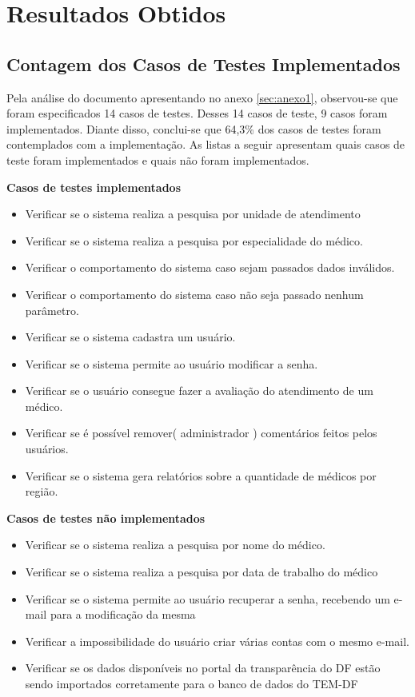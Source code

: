 \chapter[Resultados Obtidos]{Resultados Obtidos}

\section{Contagem dos Casos de Testes Implementados}
\label{sec:contagem-casos}
Pela análise do documento apresentando no anexo \ref{sec:anexo1}, observou-se que  foram especificados 14 casos de testes. Desses 14 casos de teste, 9 casos foram implementados. Diante disso, conclui-se que 64,3\% dos casos de testes foram contemplados com a implementação. As listas a seguir apresentam quais casos de teste foram implementados e quais não foram implementados.

\textbf{Casos de testes implementados}
\begin{itemize}
	\item Verificar se o sistema realiza a pesquisa por unidade de atendimento
	\item Verificar se o sistema realiza a pesquisa por especialidade do médico.
	\item Verificar o comportamento do sistema caso sejam passados dados inválidos.
	\item Verificar o comportamento do sistema caso não seja passado nenhum parâmetro.
	\item Verificar se o sistema cadastra um usuário.
	\item Verificar se o sistema permite ao usuário modificar a senha.
	\item Verificar se o usuário consegue fazer a avaliação do atendimento de um médico.
	\item Verificar se é possível remover( administrador ) comentários feitos pelos usuários.
	\item Verificar se o sistema gera relatórios sobre a quantidade de médicos por região.
\end{itemize}

\textbf{Casos de testes não implementados}
\begin{itemize}
	\item Verificar se o sistema realiza a pesquisa por nome do médico.
	\item Verificar se o sistema realiza a pesquisa por data de trabalho do médico
	\item Verificar se o sistema permite ao usuário recuperar a senha, recebendo um e-mail para a modificação da mesma
	\item Verificar a impossibilidade do usuário criar várias contas com o mesmo e-mail. 
	\item Verificar se os dados disponíveis no portal da transparência do DF estão sendo importados corretamente para o banco de dados do TEM-DF
\end{itemize}

